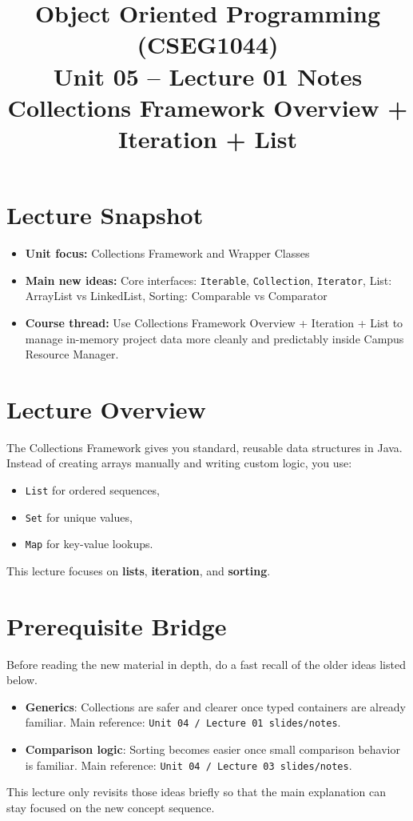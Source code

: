 \documentclass[11pt]{article}
\title{Object Oriented Programming (CSEG1044)\\Unit 05 -- Lecture 01 Notes\\Collections Framework Overview + Iteration + List}
\begin{document}
\maketitle
\tableofcontents

\section{Lecture Snapshot}
\begin{itemize}
  \item \textbf{Unit focus:} Collections Framework and Wrapper Classes
  \item \textbf{Main new ideas:} Core interfaces: \texttt{Iterable}, \texttt{Collection}, \texttt{Iterator}, List: ArrayList vs LinkedList, Sorting: Comparable vs Comparator
  \item \textbf{Course thread:} Use Collections Framework Overview + Iteration + List to manage in-memory project data more cleanly and predictably inside Campus Resource Manager.
\end{itemize}
\notesources{\OOPSUnitVSources}

\section{Lecture Overview}
The Collections Framework gives you standard, reusable data structures in Java.
Instead of creating arrays manually and writing custom logic, you use:
\begin{itemize}
  \item \texttt{List} for ordered sequences,
  \item \texttt{Set} for unique values,
  \item \texttt{Map} for key-value lookups.
\end{itemize}
This lecture focuses on \textbf{lists}, \textbf{iteration}, and \textbf{sorting}.
\notesources{\OOPSUnitVSources}

\section{Prerequisite Bridge}
Before reading the new material in depth, do a fast recall of the older ideas listed below.
\begin{itemize}
  \item \textbf{Generics}: Collections are safer and clearer once typed containers are already familiar. Main reference: \texttt{Unit 04 / Lecture 01 slides/notes}.
  \item \textbf{Comparison logic}: Sorting becomes easier once small comparison behavior is familiar. Main reference: \texttt{Unit 04 / Lecture 03 slides/notes}.
\end{itemize}
This lecture only revisits those ideas briefly so that the main explanation can stay focused on the new concept sequence.
\notesources{\OOPSUnitVSources}
\end{document}
